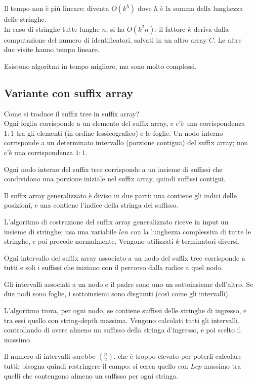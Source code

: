 Il tempo non è più lineare: diventa $O(k^h)$ dove $h$ è la somma della lunghezza delle stringhe. \\
In caso di stringhe tutte lunghe $n$, si ha $O(k^2n)$: il fattore $k$ deriva dalla computazione del numero di identificatori, salvati in un altro array $C$. Le altre due visite hanno tempo lineare.

Esistono algoritmi in tempo migliore, ma sono molto complessi.

\subsection{Variante con suffix array}
Come si traduce il suffix tree in suffix array? \\
Ogni foglia corrisponde a un elemento del suffix array, e c'è una corrispondenza $1 : 1$ tra gli elementi (in ordine lessicografico) e le foglie. Un nodo interno corrisponde a un determinato intervallo (porzione contigua) del suffix array; non c'è una corrispondenza $1 : 1$. 

Ogni nodo interno del suffix tree corrisponde a un insieme di suffissi che condividono una porzione iniziale nel suffix array, quindi suffissi contigui.

Il suffix array generalizzato è diviso in due parti: una contiene gli indici delle posizioni, e una contiene l'indice della stringa del suffisso.

L'algoritmo di costruzione del suffix array generalizzato riceve in input un insieme di stringhe; usa una variabile $len$ con la lunghezza complessiva di tutte le stringhe, e poi procede normalmente. Vengono utilizzati $k$ terminatori diversi.

Ogni intervallo del suffix array associato a un nodo del suffix tree corrisponde a tutti e soli i suffissi che iniziano con il percorso dalla radice a quel nodo.

Gli intervalli associati a un nodo e il padre sono uno un sottoinsieme dell'altro. Se due nodi sono foglie, i sottoinsiemi sono disgiunti (così come gli intervalli).

L'algoritmo trova, per ogni nodo, se contiene suffissi delle stringhe di ingresso, e tra essi quello con string-depth massima. Vengono calcolati tutti gli intervalli, controllando di avere almeno un suffisso della stringa d'ingresso, e poi scelto il massimo.

Il numero di intervalli sarebbe $\binom{n}{2}$, che è troppo elevato per poterli calcolare tutti; bisogna quindi restringere il campo: si cerca quello con $Lcp$ massimo tra quelli che contengono almeno un suffisso per ogni stringa.

